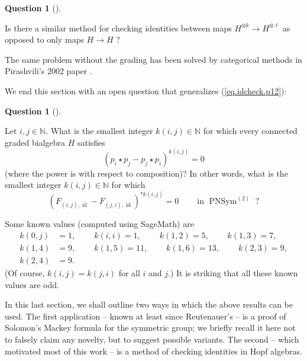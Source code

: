 \documentclass[numbers=enddot,12pt,final,onecolumn,notitlepage]{scrartcl}%
\theoremstyle{definition}
\newtheorem{quest}[theo]{Question}
\newenvironment{question}[1][]
{\begin{quest}[#1]\begin{leftbar}}
{\end{leftbar}\end{quest}}
\newenvironment{question}[1][Question]{\noindent\textbf{#1.} }{\ \rule{0.5em}{0.5em}}
\newenvironment{noncompile}{}{}
\begin{document}
\begin{question}
Is there a similar method for checking identities between maps $H^{\otimes
k}\rightarrow H^{\otimes\ell}$ as opposed to only maps $H\rightarrow H$ ?
\end{question}

The same problem without the grading has been solved by categorical methods in
Pirashvili's 2002 paper \cite{Pirash02}. \medskip

We end this section with an open question that generalizes
(\ref{eq.idcheck.p12}):

\begin{question}
Let $i,j\in\mathbb{N}$. What is the smallest integer $k\left(  i,j\right)
\in\mathbb{N}$ for which every connected graded bialgebra $H$ satisfies%
\[
\left(  p_{i}\star p_{j}-p_{j}\star p_{i}\right)  ^{k\left(  i,j\right)  }=0
\]
(where the power is with respect to composition)? In other words, what is the
smallest integer $k\left(  i,j\right)  \in\mathbb{N}$ for which
\[
\left(  F_{\left(  i,j\right)  ,\operatorname*{id}}-F_{\left(  j,i\right)
,\operatorname*{id}}\right)  ^{\ast k\left(  i,j\right)  }%
=0\ \ \ \ \ \ \ \ \ \ \text{in }\operatorname*{PNSym}\nolimits^{\left(
2\right)  }\text{ ?}%
\]

\end{question}

Some known values (computed using SageMath) are%
\begin{align*}
k\left(  0,j\right)   &  =1,\ \ \ \ \ \ \ \ \ \ k\left(  i,i\right)
=1,\ \ \ \ \ \ \ \ \ \ k\left(  1,2\right)  =5,\ \ \ \ \ \ \ \ \ \ k\left(
1,3\right)  =7,\\
k\left(  1,4\right)   &  =9,\ \ \ \ \ \ \ \ \ \ k\left(  1,5\right)
=11,\ \ \ \ \ \ \ \ \ \ k\left(  1,6\right)  =13,\ \ \ \ \ \ \ \ \ \ k\left(
2,3\right)  =9,\\
k\left(  2,4\right)   &  =9.
\end{align*}
(Of course, $k\left(  i,j\right)  =k\left(  j,i\right)  $ for all $i$ and
$j$.) It is striking that all these known values are odd.

\begin{noncompile}
In this last section, we shall outline two ways in which the above results can
be used. The first application -- known at least since Reutenauer's
\cite{Reuten93} -- is a proof of Solomon's Mackey formula for the symmetric
group; we briefly recall it here not to falsely claim any novelty, but to
suggest possible variants. The second -- which motivated most of this work --
is a method of checking identities in Hopf algebras.
\end{noncompile}
\end{document}
